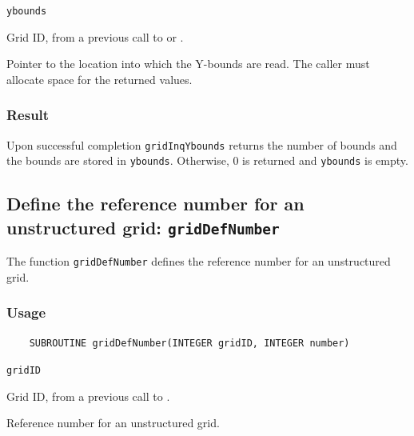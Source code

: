 \hspace*{4mm}\begin{minipage}[]{15cm}
\begin{deflist}{\texttt{ybounds}\ }
\item[\texttt{gridID}]
Grid ID, from a previous call to {} or {}.
\item[\texttt{ybounds}]
Pointer to the location into which the Y-bounds are read.
                    The caller must allocate space for the returned values.

\end{deflist}
\end{minipage}

\subsubsection*{Result}

Upon successful completion {\texttt{gridInqYbounds}} returns the number of bounds and
the bounds are stored in {\texttt{ybounds}}.
Otherwise, 0 is returned and {\texttt{ybounds}} is empty.



\subsection{Define the reference number for an unstructured grid: \texttt{gridDefNumber}}
\label{gridDefNumber}

The function {\texttt{gridDefNumber}} defines the reference number for an unstructured grid.

\subsubsection*{Usage}

\begin{verbatim}
    SUBROUTINE gridDefNumber(INTEGER gridID, INTEGER number)
\end{verbatim}

\hspace*{4mm}\begin{minipage}[]{15cm}
\begin{deflist}{\texttt{gridID}\ }
\item[\texttt{gridID}]
Grid ID, from a previous call to {}.
\item[\texttt{number}]
Reference number for an unstructured grid.

\end{deflist}
\end{minipage}


